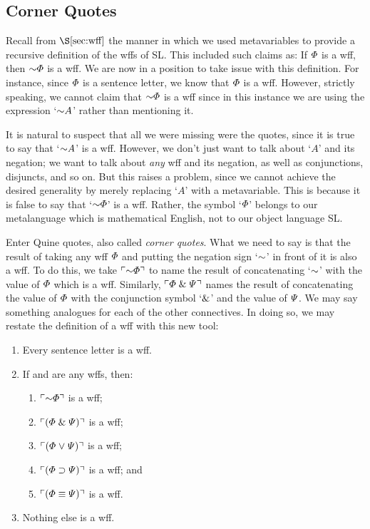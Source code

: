 \subsection{Corner Quotes}
  \label{sec:Corner Quotes}

Recall from $\S\ref{sec:wff}$ the manner in which we used metavariables to provide a recursive definition of the wffs of SL.
This included such claims as: If $\varPhi{}$ is a wff, then $\enot \metaA{}$ is a wff.
We are now in a position to take issue with this definition.
For instance, since $\varPhi$ is a sentence letter, we know that $\varPhi$ is a wff. 
However, strictly speaking, we cannot claim that $\enot \metaA$ is a wff since in this instance we are using the expression `$\enot A$' rather than mentioning it.

It is natural to suspect that all we were missing were the quotes, since it is true to say that `$\enot A$' is a wff.
However, we don't just want to talk about `$A$' and its negation; we want to talk about \textit{any} wff and its negation, as well as conjunctions, disjuncts, and so on.
But this raises a problem, since we cannot achieve the desired generality by merely replacing `$A$' with a metavariable.
This is because it is false to say that `$\enot \metaA{}$' is a wff.
Rather, the symbol `$\varPhi{}$' belongs to our metalanguage which is mathematical English, not to our object language SL.

Enter Quine quotes, also called \textit{corner quotes}.
What we need to say is that the result of taking any wff $\varPhi{}$ and putting the negation sign `$\enot$' in front of it is also a wff.
To do this, we take $\corner{\enot \metaA{}}$ to name the result of concatenating `$\enot$' with the value of $\varPhi$ which is a wff. 
Similarly, $\ulcorner\varPhi{} \mathrel\& \varPsi{}\urcorner$ names the result of concatenating the value of $\varPhi{}$ with the conjunction symbol `$\mathrel\&$' and the value of $\varPsi{}$.
We may say something analogues for each of the other connectives.
In doing so, we may restate the definition of a wff with this new tool:

\begin{enumerate}
  \item Every sentence letter is a wff.
  \item If \metaA{} and \metaB{} are any wffs, then:
    \begin{enumerate}
      \item $\corner{\enot\metaA{}}$ is a wff;
      \item $\ulcorner(\varPhi{}\mathrel\&\varPsi{})\urcorner$ is a wff;
      \item $\ulcorner(\varPhi{}\mkern1mu\vee\mkern1mu\varPsi{})\urcorner$ is a wff;
      \item $\ulcorner(\varPhi{}\supset\varPsi{})\urcorner$ is a wff; and
      \item $\ulcorner(\varPhi{}\equiv\varPsi{})\urcorner$ is a wff.
    \end{enumerate}
  \item Nothing else is a wff.
\end{enumerate}

